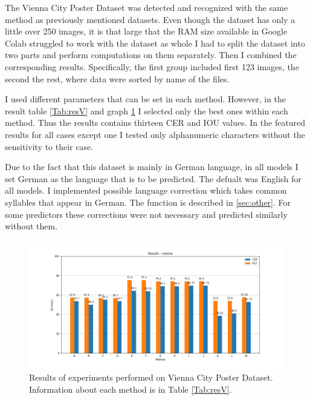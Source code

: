 The Vienna City Poster Dataset was detected and recognized with the same method as previously mentioned datasets. Even though the dataset has only a little over 250 images, it is that large that the RAM size available in Google Colab struggled to work with the dataset as whole I had to split the dataset into two parts and perform computations on them separately. Then I combined the corresponding results. Specifically, the first group included first 123 images, the second the rest, where data were sorted by name of the files.

I used different parameters that can be set in each method. However, in the result table \ref*{Tab:resV} and graph \ref*{Im:resV} I selected only the best ones within each method. Thus the results contains     thirteen CER and IOU values. In the featured results for all cases except one I tested only alphanumeric characters without the sensitivity to their case.

Due to the fact that this dataset is mainly in German language, in all models I set German as the language that is to be predicted. The defualt was English for all models. I implemented possible language correction which takes common syllables that appear in German. The function is described in \ref{sec:other}. For some predictors these corrections were not necessary and predicted similarly without them. 

\begin{figure}[hbtp!]
    \centering
    \includegraphics[width=\textwidth]{obrazky/grafy/resvienna.png}
    \caption{Results of experiments performed on Vienna City Poster Dataset. Information about each method is in Table \ref*{Tab:resV}.}
    \label{Im:resV}
\end{figure}


